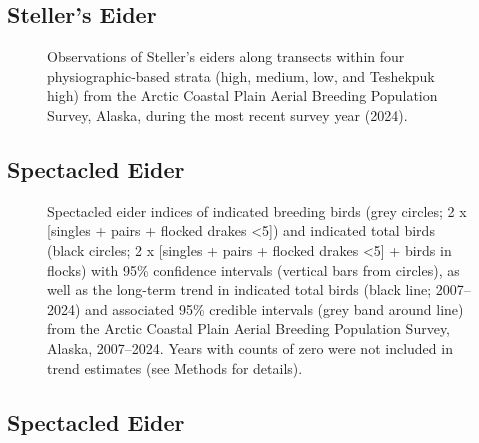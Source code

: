 \documentclass[
]{article}
\begin{document}
\subsection*{Steller's Eider}\label{stellers-eider-2}

\begin{figure}


\caption{\label{fig-STEImap}Observations of Steller's eiders along
transects within four physiographic-based strata (high, medium, low, and
Teshekpuk high) from the Arctic Coastal Plain Aerial Breeding Population
Survey, Alaska, during the most recent survey year (2024).}

\end{figure}%

\newpage{}

\subsection*{Spectacled Eider}\label{spectacled-eider}

\begin{figure}


\caption{\label{fig-SPEI}Spectacled eider indices of indicated breeding
birds (grey circles; 2 x {[}singles + pairs + flocked drakes
\textless5{]}) and indicated total birds (black circles; 2 x {[}singles
+ pairs + flocked drakes \textless5{]} + birds in flocks) with 95\%
confidence intervals (vertical bars from circles), as well as the
long-term trend in indicated total birds (black line; 2007--2024) and
associated 95\% credible intervals (grey band around line) from the
Arctic Coastal Plain Aerial Breeding Population Survey, Alaska,
2007--2024. Years with counts of zero were not included in trend
estimates (see Methods for details).}

\end{figure}%

\newpage{}

\subsection*{Spectacled Eider}\label{spectacled-eider-1}
\end{document}
